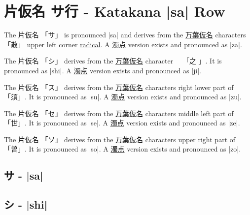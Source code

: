 \section{片仮名  サ行 - Katakana |sa| Row} \label{sec:KatakanaSaRow}


 The  片仮名 {「サ」} is pronounced  |sa| and  derives from the
\hyperref[sec:Manyogana]{万葉仮名} characters {「散」} upper left corner
\hyperref[sec:Radical]{radical}.  A \hyperref[sec:Dakuten]{濁点} version exists
and pronounced as |za|.

 The 片仮名 {「シ」} derives from the
\hyperref[sec:Manyogana]{万葉仮名} character　 {「之 」}.  It is pronounced as
|shi|.  A \hyperref[sec:Dakuten]{濁点} version exists and pronounced as |ji|.


 The 片仮名 {「ス」} derives from the
\hyperref[sec:Manyogana]{万葉仮名} characters right lower part of {「須」}.  It
is pronounced as |su|.  A \hyperref[sec:Dakuten]{濁点} version exists and
pronounced as |zu|. 

 The 片仮名 {「セ」} derives from the
\hyperref[sec:Manyogana]{万葉仮名} characters middle left part of {「世」}.
It is pronounced as |se|.  A \hyperref[sec:Dakuten]{濁点} version exists and
pronounced as |ze|.  

\newpage

 The 片仮名 {「ソ」} derives from the
\hyperref[sec:Manyogana]{万葉仮名} characters upper right part of {「曽」}.  It is
pronounced as |so|.  A \hyperref[sec:Dakuten]{濁点} version exists and
pronounced as |zo|.




\newpage

\subsection{サ - |sa|} \label{sec:KatakanaSa}


\subsection{シ - |shi|} \label{sec:KatakanaShi}

